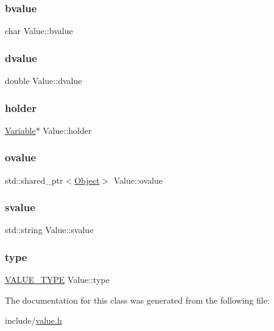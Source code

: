 \subsubsection{\texorpdfstring{bvalue}{bvalue}}
{\footnotesize\ttfamily char Value\+::bvalue}

\mbox{\label{classValue_aac350b98b4eb19c6a9b79dae50e97cc6}} 
\subsubsection{\texorpdfstring{dvalue}{dvalue}}
{\footnotesize\ttfamily double Value\+::dvalue}

\mbox{\label{classValue_af3b547ae64c4985008d6eb7c39868a3f}} 
\subsubsection{\texorpdfstring{holder}{holder}}
{\footnotesize\ttfamily \hyperlink{classVariable}{Variable}$\ast$ Value\+::holder}

\mbox{\label{classValue_a04703ea830e0cb9a24286c588e69ee28}} 
\subsubsection{\texorpdfstring{ovalue}{ovalue}}
{\footnotesize\ttfamily std\+::shared\+\_\+ptr$<$\hyperlink{classObject}{Object}$>$ Value\+::ovalue}

\mbox{\label{classValue_a033edf7ba7f753cf274565fac27f9c7d}} 
\subsubsection{\texorpdfstring{svalue}{svalue}}
{\footnotesize\ttfamily std\+::string Value\+::svalue}

\mbox{\label{classValue_a4ee4412ce2c7b78bad42d8eb93294bea}} 
\subsubsection{\texorpdfstring{type}{type}}
{\footnotesize\ttfamily \hyperlink{statics_8h_a0674a913b8e8c8a9f265baab3646b565}{V\+A\+L\+U\+E\+\_\+\+T\+Y\+PE} Value\+::type}



The documentation for this class was generated from the following file\+:\begin{DoxyCompactItemize}
\item 
include/\hyperlink{value_8h}{value.\+h}\end{DoxyCompactItemize}
